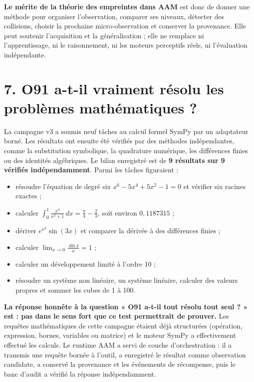 \documentclass[11pt,a4paper]{article}
\begin{document}
\textbf{Le mérite de la théorie des empreintes dans AAM} est donc de donner une méthode pour organiser l'observation, comparer ses niveaux, détecter des collisions, choisir la prochaine micro-observation et conserver la provenance. Elle peut soutenir l'acquisition et la généralisation ; elle ne remplace ni l'apprentissage, ni le raisonnement, ni les moteurs perceptifs réels, ni l'évaluation indépendante.

\section*{7. O91 a-t-il vraiment résolu les problèmes mathématiques ?}

La campagne v3 a soumis neuf tâches au calcul formel SymPy par un adaptateur borné. Les résultats ont ensuite été vérifiés par des méthodes indépendantes, comme la substitution symbolique, la quadrature numérique, les différences finies ou des identités algébriques. Le bilan enregistré est de \textbf{9 résultats sur 9 vérifiés indépendamment}. Parmi les tâches figuraient :

\begin{itemize}
\item résoudre l'équation de degré six
\(x^6-5x^4+5x^2-1=0\) et vérifier six racines exactes ;
\item calculer \(\int_0^1 \frac{x^4}{x^2+1}\,dx=\frac{\pi}{4}-\frac{2}{3}\), soit environ \(0{,}1187315\) ;
\item dériver \(e^{x^2}\sin(3x)\) et comparer la dérivée à des différences finies ;
\item calculer \(\lim_{x\to0}\frac{\sin x}{x}=1\) ;
\item calculer un développement limité à l'ordre 10 ;
\item résoudre un système non linéaire, un système linéaire, calculer des valeurs propres et sommer les cubes de 1 à 100.
\end{itemize}

\textbf{La réponse honnête à la question « O91 a-t-il tout résolu tout seul ? » est : pas dans le sens fort que ce test permettrait de prouver.} Les requêtes mathématiques de cette campagne étaient déjà structurées (opération, expression, bornes, variables ou matrice) et le moteur SymPy a effectivement effectué les calculs. Le runtime AAM a servi de couche d'orchestration : il a transmis une requête bornée à l'outil, a enregistré le résultat comme observation candidate, a conservé la provenance et les événements de récompense, puis le banc d'audit a vérifié la réponse indépendamment.
\end{document}
